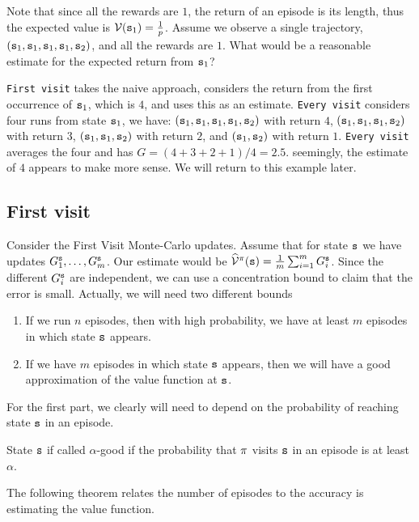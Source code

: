 Note that since all the rewards are $1$, the return of an episode is its length,
thus the expected value is $\mathcal{V}({\tt s}_1)=\frac{1}{p}$. Assume we observe a single
trajectory, $({\tt s}_1,{\tt s}_1,{\tt s}_1,{\tt s}_1,{\tt s}_2)$, and
all the rewards are $1$. What would be a reasonable estimate for the
expected return from ${\tt s}_1$?

{\tt First visit} takes the naive approach, considers the return from
the first occurrence of ${\tt s}_1$, which is $4$, and uses this as
an estimate. {\tt Every visit} considers four runs from state
${\tt s}_1$, we have:
$({\tt s}_1,{\tt s}_1,{\tt s}_1,{\tt s}_1,{\tt s}_2)$ with return $4$,
$({\tt s}_1,{\tt s}_1,{\tt s}_1,{\tt s}_2)$ with return $3$,
$({\tt s}_1,{\tt s}_1,{\tt s}_2)$ with return $2$, and
$({\tt s}_1,{\tt s}_2)$ with return $1$. {\tt Every visit} averages
the four and has $G=(4+3+2+1)/4=2.5$. seemingly, the
estimate of $4$ appears to make more sense. We will return to this
example later.

\subsection{First visit}

Consider the First Visit Monte-Carlo updates. Assume that for state
${\tt s}$ we have updates $G_1^{\tt s}, \ldots , G^{\tt s}_m$. Our
estimate would be
$\widehat{\mathcal{V}}^\pi({\tt s})=\frac{1}{m}\sum_{i=1}^m G^{\tt s}_i$.
Since the different $G^{\tt s}_i$ are independent, we can use a
concentration bound to claim that the error is small. Actually, we
will need two different bounds
\begin{enumerate}
    \item If we run $n$ episodes, then with high probability, we have at least $m$ episodes in which state ${\tt s}$ appears.
    \item If we have $m$ episodes in which state ${\tt s}$ appears, then we will have a good approximation of the value function at ${\tt s}$.
\end{enumerate}
For the first part,
we clearly will need to depend on the probability of reaching state
${\tt s}$ in an episode. 
\begin{definition}
    State ${\tt s}$ if called $\alpha$-good if the probability that $\pi$ visits ${\tt s}$ in an episode is at least $\alpha$.
\end{definition}
The following theorem relates the number of episodes to the accuracy
is estimating the value function.

